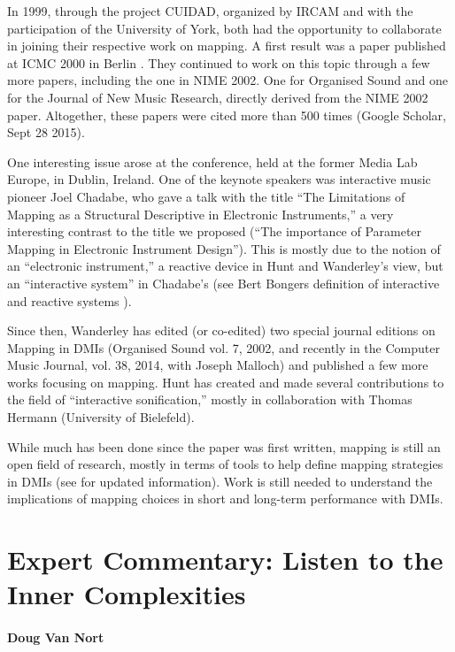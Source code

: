 In 1999, through the project CUIDAD, organized by IRCAM and with the participation of the University of York, both had the opportunity to collaborate in joining their respective work on mapping. A first result was a paper published at ICMC 2000 in Berlin \cite{Hunt:2000b}. They continued to work on this topic through a few more papers, including the one in NIME 2002. One for Organised Sound and one for the Journal of New Music Research, directly derived from the NIME 2002 paper. Altogether, these papers were cited more than 500 times (Google Scholar, Sept 28 2015).


One interesting issue arose at the conference, held at the former Media Lab Europe, in Dublin, Ireland. One of the keynote speakers was interactive music pioneer Joel Chadabe, who gave a talk with the title ``The Limitations of Mapping as a Structural Descriptive in Electronic Instruments,'' a very interesting contrast to the title we proposed (``The importance of Parameter Mapping in Electronic Instrument Design''). This is mostly due to the notion of an ``electronic instrument,'' a reactive device in Hunt and Wanderley's view, but an ``interactive system'' in Chadabe's (see Bert Bongers definition of interactive and reactive systems \cite{Bongers:2000}).

Since then, Wanderley has edited (or co-edited) two special journal editions on Mapping in DMIs (Organised Sound vol. 7, 2002, and recently in the Computer Music Journal, vol. 38, 2014, with Joseph Malloch) and published a few more works focusing on mapping. Hunt has created and made several contributions to the field of ``interactive sonification,'' mostly in collaboration with Thomas Hermann (University of Bielefeld).

While much has been done since the paper was first written, mapping is still an open field of research,  mostly in terms of tools to help define mapping strategies in DMIs (see \cite{Wanderley:2014} for updated information). Work is still needed to understand the implications of mapping choices in short and long-term performance with DMIs.


\section*{Expert Commentary: Listen to the Inner Complexities}

\paragraph{Doug Van Nort}

